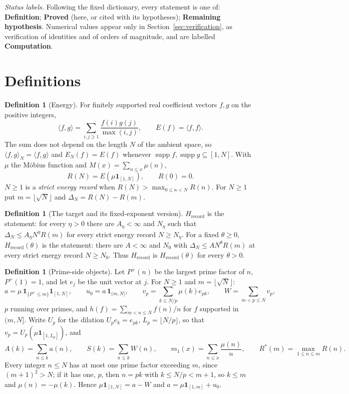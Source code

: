 \documentclass[11pt]{article}
\theoremstyle{definition}
\newtheorem{definition}[theorem]{Definition}
\theoremstyle{remark}
\newcommand{\ip}[2]{\langle #1,#2\rangle}
\newcommand{\Hrec}{H_{\mathrm{record}}}
\newcommand{\Rstar}{R^{*}}
\DeclareMathOperator{\supp}{supp}
\begin{document}
\noindent\emph{Status labels.} Following the fixed dictionary, every statement is one of: \textbf{Definition}; \textbf{Proved} (here, or cited with its hypotheses); \textbf{Remaining hypothesis}. Numerical values appear only in Section~\ref{sec:verification}, as verification of identities and of orders of magnitude, and are labelled \textbf{Computation}.

\section{Definitions}\label{sec:defs}

\begin{definition}[Energy]\label{def:energy}
For finitely supported real coefficient vectors $f,g$ on the positive integers,
\[
\ip fg=\sum_{i,j\ge1}\frac{f(i)g(j)}{\max(i,j)},\qquad E(f)=\ip ff .
\]
The sum does not depend on the length $N$ of the ambient space, so $\ip fg_N=\ip fg$ and $E_N(f)=E(f)$ whenever $\supp f,\supp g\subseteq[1,N]$. With $\mu$ the M\"obius function and $M(x)=\sum_{n\le x}\mu(n)$,
\[
R(N)=E(\mu\mathbf 1_{[1,N]}),\qquad R(0)=0 .
\]
$N\ge1$ is a \emph{strict energy record} when $R(N)>\max_{0\le n<N}R(n)$. For $N\ge1$ put $m=\lfloor\sqrt N\rfloor$ and $\Delta_N=R(N)-R(m)$.
\end{definition}

\begin{definition}[The target and its fixed-exponent version]\label{def:H}
$\Hrec$ is the statement: for every $\eta>0$ there are $A_\eta<\infty$ and $N_\eta$ such that $\Delta_N\le A_\eta N^\eta R(m)$ for every strict energy record $N\ge N_\eta$. For a fixed $\theta\ge0$, $\Hrec(\theta)$ is the statement: there are $A<\infty$ and $N_0$ with $\Delta_N\le AN^\theta R(m)$ at every strict energy record $N\ge N_0$. Thus $\Hrec$ is $\Hrec(\theta)$ for every $\theta>0$.
\end{definition}

\begin{definition}[Prime-side objects]\label{def:prime}
Let $P^+(n)$ be the largest prime factor of $n$, $P^+(1)=1$, and let $e_j$ be the unit vector at $j$. For $N\ge1$ and $m=\lfloor\sqrt N\rfloor$:
\[
a=\mu\,\mathbf 1_{\{P^+\le m\}}\mathbf 1_{[1,N]},\qquad u_0=a\,\mathbf 1_{(m,N]},\qquad
v_p=\sum_{k\le N/p}\mu(k)e_{pk},\qquad W=\sum_{m<p\le N}v_p ,
\]
$p$ running over primes, and $h(f)=\sum_{m<n\le N}f(n)/n$ for $f$ supported in $(m,N]$. Write $U_p$ for the dilation $U_pe_k=e_{pk}$, $L_p=\lfloor N/p\rfloor$, so that $v_p=U_p(\mu\mathbf 1_{[1,L_p]})$, and
\[
A(k)=\sum_{n\le k}a(n),\qquad S(k)=\sum_{n\le k}W(n),\qquad m_1(x)=\sum_{n\le x}\frac{\mu(n)}n,\qquad \Rstar(m)=\max_{1\le n\le m}R(n).
\]
Every integer $n\le N$ has at most one prime factor exceeding $m$, since $(m+1)^2>N$; if it has one, $p$, then $n=pk$ with $k\le N/p<m+1$, so $k\le m$ and $\mu(n)=-\mu(k)$. Hence $\mu\mathbf 1_{[1,N]}=a-W$ and $a=\mu\mathbf 1_{[1,m]}+u_0$.
\end{definition}
\end{document}
